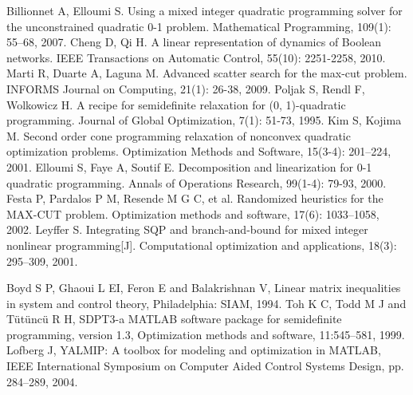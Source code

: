 \documentclass[conference]{IEEEtran}
\begin{document}
\begin{thebibliography}{00}
Billionnet A, Elloumi S. Using a mixed integer quadratic programming solver for the unconstrained quadratic 0-1 problem. Mathematical Programming, 109(1): 55--68, 2007.
Cheng D, Qi H. A linear representation of dynamics of Boolean networks. IEEE Transactions on Automatic Control, 55(10): 2251-2258, 2010.
Marti R, Duarte A, Laguna M. Advanced scatter search for the max-cut problem. INFORMS Journal on Computing, 21(1): 26-38, 2009.
Poljak S, Rendl F, Wolkowicz H. A recipe for semidefinite relaxation for (0, 1)-quadratic programming. Journal of Global Optimization, 7(1): 51-73, 1995.
Kim S, Kojima M. Second order cone programming relaxation of nonconvex quadratic optimization problems. Optimization Methods and Software, 15(3-4): 201--224,  2001.
Elloumi S, Faye A, Soutif E. Decomposition and linearization for 0-1 quadratic programming. Annals of Operations Research, 99(1-4): 79-93, 2000.
Festa P, Pardalos P M, Resende M G C, et al. Randomized heuristics for the MAX-CUT problem. Optimization methods and software, 17(6): 1033--1058, 2002.
Leyffer S. Integrating SQP and branch-and-bound for mixed integer nonlinear programming[J]. Computational optimization and applications, 18(3): 295--309, 2001.

 Boyd S P, Ghaoui L EI, Feron E and Balakrishnan V, Linear matrix inequalities in system and control theory, Philadelphia: SIAM, 1994.
 Toh K C, Todd M J and T{\"u}t{\"u}nc{\"u} R H, SDPT3-a MATLAB software package for semidefinite programming, version 1.3, Optimization methods and software, 11:545--581, 1999.
 Lofberg J, YALMIP: A toolbox for modeling and optimization in MATLAB, IEEE International Symposium on Computer Aided Control Systems Design, pp. 284--289, 2004.

\end{thebibliography}
\end{document}
